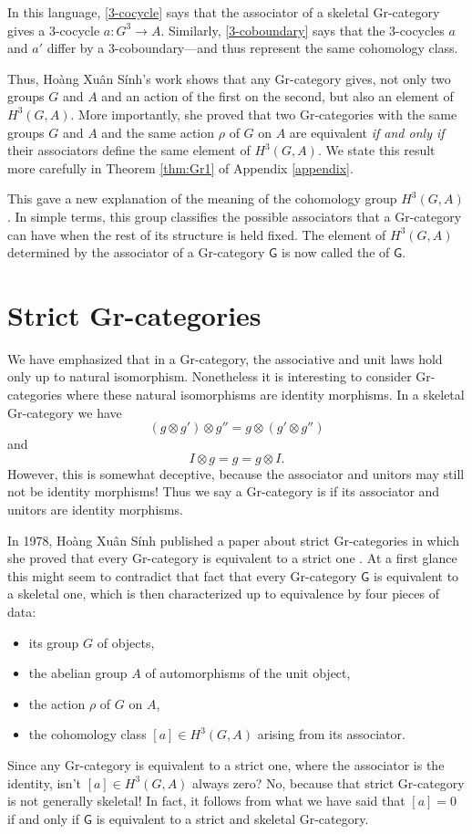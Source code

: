 \documentclass[reqno,12pt]{amsart}
\newcommand{\maps}{\colon}    %
\newcommand{\G}{{\mathsf{G}}}   %
\newcommand{\define}[1]{\textbf{\boldmath{#1}}}
\theoremstyle{definition}
\begin{document}
In this language, \eqref{3-cocycle} says that the associator of a skeletal Gr-category gives a 3-cocycle $a \maps G^3 \to A$.   Similarly, \eqref{3-coboundary} says that the 3-cocycles $a$ and $a'$ differ by a 3-coboundary---and thus represent the same cohomology class.  

Thus, Ho\`ang Xu\^an S\'inh's work shows that any Gr-category gives, not only two groups $G$ and $A$ and an action of the first on the second, but also an element of $H^3(G,A)$. More importantly, she proved that two Gr-categories with the same groups $G$ and $A$ and the same action $\rho$ of $G$ on $A$ are equivalent \emph{if and only if} their associators define the same element of $H^3(G,A)$.  We state this result more carefully in Theorem \ref{thm:Gr1} of Appendix \ref{appendix}. 

This gave a new explanation of the meaning of the cohomology group $H^3(G,A)$.  In simple terms, this group classifies the possible associators that a Gr-category can have when the rest of its structure is held fixed.  The element of $H^3(G,A)$ determined by the associator of a Gr-category $\G$ is now called the \define{S\'inh invariant} of $\G$.

\section{Strict Gr-categories}
\label{sec:strict_Gr}

We have emphasized that in a Gr-category, the associative and unit laws hold only up to natural isomorphism.   Nonetheless it is interesting to consider Gr-categories where these natural isomorphisms are identity morphisms.   In a skeletal Gr-category we have
\[    (g \otimes g') \otimes g'' = g \otimes (g' \otimes g'') \]
and
\[      I \otimes g = g = g \otimes I.  \]
However, this is somewhat deceptive, because the associator and unitors may still not be identity morphisms!   Thus we say a Gr-category is \define{strict} if its associator and unitors are identity morphisms.   

In 1978, Ho\`ang Xu\^an S\'inh published a paper about strict Gr-categories in which she proved that every Gr-category is equivalent to a strict one \cite{H78}.  At a first glance this might seem to contradict that fact that every Gr-category $\G$ is equivalent to a skeletal one, which is then characterized up to equivalence by four pieces of data:
\begin{itemize}
\item its group $G$ of objects,
\item the abelian group $A$ of automorphisms of the unit object,
\item the action $\rho$ of $G$ on $A$,
\item the cohomology class $[a] \in H^3(G,A)$ arising from its associator.
\end{itemize}
Since any Gr-category is equivalent to a strict one, where the associator is the identity, isn't $[a] \in H^3(G,A)$ always zero?  No, because that strict Gr-category is not generally skeletal!   In fact, it follows from what we have said that $[a] = 0$ if and only if $\G$ is equivalent to a strict and skeletal Gr-category.  
\end{document}
